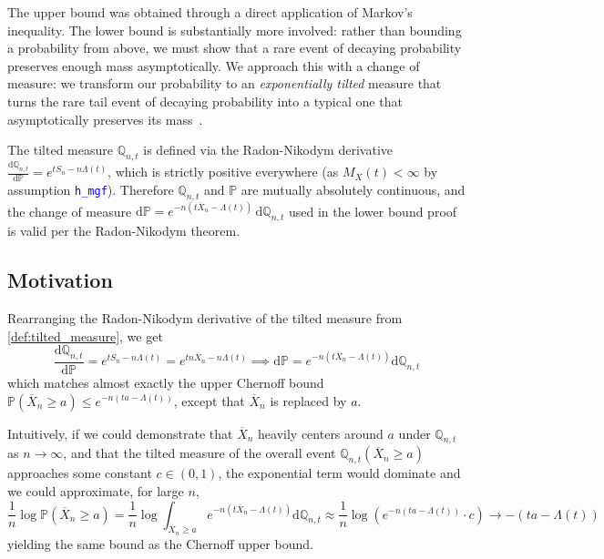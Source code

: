 \documentclass{article}
\newcommand{\leancode}[1]{\textcolor{blue}{\nolinkurl{#1}}}
\renewcommand{\P}{\mathbb{P}}
\newcommand{\Q}{\mathbb{Q}}
\begin{document}
The upper bound was obtained through a direct application of Markov's inequality.
The lower bound is substantially more involved: rather than bounding a probability from above, we must show that a rare event of decaying probability preserves enough mass asymptotically.
We approach this with a change of measure: we transform our probability to an
\emph{exponentially tilted} measure that turns the rare tail event of decaying probability into a typical one that asymptotically preserves its mass~\cite{dembo1998large}.

The tilted measure $\Q_{n,t}$ is defined via the Radon-Nikodym derivative
$\frac{\text{d}\Q_{n,t}}{\text{d}\P} = e^{tS_n - n\Lambda(t)}$, which is strictly positive
everywhere (as $M_X(t) < \infty$ by assumption \leancode{h\_mgf}).
Therefore $\Q_{n,t}$ and $\P$ are mutually absolutely continuous, and the change of measure $\text{d}\P = e^{-n(t\overline{X}_n - \Lambda(t))}\,\text{d}\Q_{n,t}$ used in the lower bound proof is valid per the Radon-Nikodym theorem.

\subsection{Motivation}
\label{subsection:motivation}
Rearranging the Radon-Nikodym derivative of the tilted measure from \cref{def:tilted_measure},
we get
\begin{equation}
  \frac{\text{d}\Q_{n,t}}{\text{d}\P} = e^{t S_n - n \Lambda(t)} = e^{t n \overline{X}_n - n \Lambda(t)} \implies \text{d}\P = e^{-n(t\overline{X}_n - \Lambda(t))}\text{d}\Q_{n,t}
\end{equation}
which matches almost exactly the upper Chernoff bound
$\P(\overline{X}_n \ge a) \le e^{-n(ta - \Lambda(t))}$, except that
$\overline{X}_n$ is replaced by $a$.

Intuitively, if we could demonstrate that $\overline{X}_n$ heavily centers around $a$ under $\Q_{n,t}$ as $n\to\infty$, and that the tilted measure of the overall event
$\Q_{n,t}(\overline{X}_n \ge a)$ approaches some constant $c \in (0,1)$, the exponential
term would dominate and we could approximate, for large $n$,
\begin{equation}
  \frac{1}{n} \log \P(\overline{X}_n \ge a)
  = \frac{1}{n} \log \int_{\overline{X}_n \ge a}e^{-n(t\overline{X}_n - \Lambda(t))}\text{d}\Q_{n,t}
  \approx \frac{1}{n} \log \left(e^{-n(ta - \Lambda(t))} \cdot c\right)
  \to -(ta  - \Lambda(t))
\end{equation}
yielding the same bound as the Chernoff upper bound.
\end{document}
